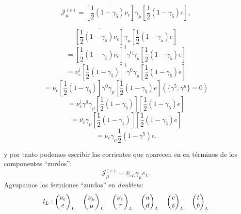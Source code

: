 \documentclass{article}
\theoremstyle{plain}
\theoremstyle{definition}
\begin{document}
	\[
	\mathcal{J}_\mu^{(e)} = \overline{\left[\frac{1}{2}\left(1-\gamma_5\right)\nu_e\right]} \gamma_{\mu}\left[\frac{1}{2}\left(1-\gamma_5\right)e\right],
	\]
	\begin{longfbox}
		\[
		\overline{\left[\frac{1}{2}\left(1-\gamma_5\right)\nu_e\right]} \gamma_{\mu}\left[\frac{1}{2}\left(1-\gamma_5\right)e\right]
		\]
		\[=
		\left[\frac{1}{2}\left(1-\gamma_5\right)\nu_e\right]^\dagger\gamma^0 \gamma_{\mu}\left[\frac{1}{2}\left(1-\gamma_5\right)e\right]
		\]
		\[=\nu_e^\dagger\left[\frac{1}{2}\left(1-\gamma_5\right)\right]^\dagger\gamma^0 \gamma_{\mu}\left[\frac{1}{2}\left(1-\gamma_5\right)e\right] \]
		\[=\nu_e^\dagger\left[\frac{1}{2}\left(1-\gamma_5\right)\right]\gamma^0 \gamma_{\mu}\left[\frac{1}{2}\left(1-\gamma_5\right)e\right]  (\{\gamma^5,\gamma^\mu\}=0) \]
		\[=\nu_e^\dagger\gamma^0 \gamma_{\mu}\left[\frac{1}{2}\left(1-\gamma_5\right)\right]\left[\frac{1}{2}\left(1-\gamma_5\right)e\right]\]
		\[=\bar{\nu_e} \gamma_{\mu}\left[\frac{1}{2}\left(1-\gamma_5\right)\right]\left[\frac{1}{2}\left(1-\gamma_5\right)e\right] \]
		\[=\bar{\nu}_e\gamma_\mu\frac{1}{2}(1-\gamma^5)e\text{.}\]
		
		
	\end{longfbox}
	y por tanto podemos escribir las corrientes que aparecen en  en términos de los componentes ``zurdos'': 
	\[\mathcal{J}_\mu^{(e)} =\bar{\nu}_{eL}\gamma_\mu e_L\text{.}\]
	Agrupamos los fermiones ``zurdos'' en \textit{doublets}:
	\[
	l_L: \left(\begin{array}{@{}c@{}}
	\nu_e \\
	e
	\end{array} \right)_L
	\quad
	\left(\begin{array}{@{}c@{}}
	\nu_{\mu} \\
	\mu
	\end{array} \right)_L
	\quad
	\left(\begin{array}{@{}c@{}}
	\nu_{\tau} \\
	\tau
	\end{array} \right)_L
	\quad
	\left(\begin{array}{@{}c@{}}
	u \\
	d
	\end{array} \right)_L
	\quad
	\left(\begin{array}{@{}c@{}}
	c \\
	s
	\end{array} \right)_L
	\quad
	\left(\begin{array}{@{}c@{}}
	t \\
	b
	\end{array} \right)_L
	\]
\end{document}
